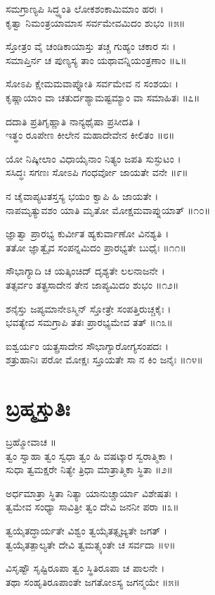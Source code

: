 ಸಮಗ್ರಾಣ್ಯಪಿ ಸಿದ್ಧ್ಯಂತಿ ಲೋಕಶಂಕಾಮಿಮಾಂ ಹರಃ ।\\
ಕೃತ್ವಾ ನಿಮಂತ್ರಯಾಮಾಸ ಸರ್ವಮೇವಮಿದಂ ಶುಭಂ ॥೫॥

ಸ್ತೋತ್ರಂ ವೈ ಚಂಡಿಕಾಯಾಸ್ತು ತಚ್ಚ ಗುಹ್ಯಂ ಚಕಾರ ಸಃ ।\\
ಸಮಾಪ್ತಿರ್ನ ಚ ಪುಣ್ಯಸ್ಯ ತಾಂ ಯಥಾವನ್ನಿಯಂತ್ರಣಾಂ ॥೬॥

ಸೋಽಪಿ ಕ್ಷೇಮಮವಾಪ್ನೋತಿ ಸರ್ವಮೇವ ನ ಸಂಶಯಃ ।\\
ಕೃಷ್ಣಾಯಾಂ ವಾ ಚತುರ್ದಶ್ಯಾಮಷ್ಟಮ್ಯಾಂ ವಾ ಸಮಾಹಿತಃ ॥೭॥

ದದಾತಿ ಪ್ರತಿಗೃಹ್ಣಾತಿ ನಾನ್ಯಥೈಷಾ ಪ್ರಸೀದತಿ ।\\
ಇತ್ಥಂ ರೂಪೇಣ ಕೀಲೇನ ಮಹಾದೇವೇನ ಕೀಲಿತಂ ॥೮॥

ಯೋ ನಿಷ್ಕೀಲಾಂ ವಿಧಾಯೈನಾಂ ನಿತ್ಯಂ ಜಪತಿ ಸುಸ್ಫುಟಂ ।\\
ಸಸಿದ್ಧಃ ಸಗಣಃ ಸೋಽಪಿ ಗಂಧರ್ವೋ ಜಾಯತೇ ವನೇ ॥೯॥

ನ ಚೈವಾಪ್ಯಟತಸ್ತಸ್ಯ ಭಯಂ ಕ್ವಾಪಿ ಹಿ ಜಾಯತೇ ।\\
ನಾಪಮೃತ್ಯುವಶಂ ಯಾತಿ ಮೃತೋ ಮೋಕ್ಷಮವಾಪ್ನುಯಾತ್ ॥೧೦॥

ಜ್ಞಾತ್ವಾ ಪ್ರಾರಭ್ಯ ಕುರ್ವೀತ ಹ್ಯಕುರ್ವಾಣೋ ವಿನಶ್ಯತಿ ।\\
ತತೋ ಜ್ಞಾತ್ವೈವ ಸಂಪನ್ನಮಿದಂ ಪ್ರಾರಭ್ಯತೇ ಬುಧೈಃ ॥೧೧॥

ಸೌಭಾಗ್ಯಾದಿ ಚ ಯತ್ಕಿಂಚಿದ್ ದೃಶ್ಯತೇ ಲಲನಾಜನೇ ।\\
ತತ್ಸರ್ವಂ ತತ್ಪ್ರಸಾದೇನ ತೇನ ಜಾಪ್ಯಮಿದಂ ಶುಭಂ ॥೧೨॥

ಶನೈಸ್ತು ಜಪ್ಯಮಾನೇಽಸ್ಮಿನ್ ಸ್ತೋತ್ರೇ ಸಂಪತ್ತಿರುಚ್ಚಕೈಃ ।\\
ಭವತ್ಯೇವ ಸಮಗ್ರಾಪಿ ತತಃ ಪ್ರಾರಭ್ಯಮೇವ ತತ್ ॥೧೩॥

ಐಶ್ವರ್ಯಂ ಯತ್ಪ್ರಸಾದೇನ ಸೌಭಾಗ್ಯಾರೋಗ್ಯಸಂಪದಃ ।\\
ಶತ್ರುಹಾನಿಃ ಪರೋ ಮೋಕ್ಷಃ ಸ್ತೂಯತೇ ಸಾ ನ ಕಿಂ ಜನೈಃ ॥೧೪॥
\section{ಬ್ರಹ್ಮಸ್ತುತಿಃ}
ಬ್ರಹ್ಮೋವಾಚ ॥\\
ತ್ವಂ ಸ್ವಾಹಾ ತ್ವಂ ಸ್ವಧಾ ತ್ವಂ ಹಿ ವಷಟ್ಕಾರ ಸ್ವರಾತ್ಮಿಕಾ ।\\
ಸುಧಾ ತ್ವಮಕ್ಷರೇ ನಿತ್ಯೇ ತ್ರಿಧಾ ಮಾತ್ರಾತ್ಮಿಕಾ ಸ್ಥಿತಾ ॥೨॥

ಅರ್ಧಮಾತ್ರಾ ಸ್ಥಿತಾ ನಿತ್ಯಾ ಯಾನುಚ್ಚಾರ್ಯಾ ವಿಶೇಷತಃ ।\\
ತ್ವಮೇವ ಸಂಧ್ಯಾ ಸಾವಿತ್ರೀ ತ್ವಂ ದೇವಿ ಜನನೀ ಪರಾ ॥೩॥

ತ್ವಯೈತದ್ಧಾರ್ಯತೇ ವಿಶ್ವಂ ತ್ವಯೈತತ್ಸೃಜ್ಯತೇ ಜಗತ್ ।\\
ತ್ವಯೈತತ್ಪಾಲ್ಯತೇ ದೇವಿ ತ್ವಮತ್ಸ್ಯಂತೇ ಚ ಸರ್ವದಾ ॥೪॥

ವಿಸೃಷ್ಟೌ ಸೃಷ್ಟಿರೂಪಾ ತ್ವಂ ಸ್ಥಿತಿರೂಪಾ ಚ ಪಾಲನೇ ।\\
ತಥಾ ಸಂಹೃತಿರೂಪಾಂತೇ ಜಗತೋಽಸ್ಯ ಜಗನ್ಮಯೇ ॥೫॥

